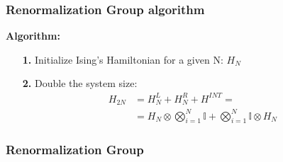 \documentclass[pt12]{beamer}
\begin{document}
\begin{frame}[fragile,label=RB]
	\frametitle{Renormalization Group algorithm}
	\tableofcontents[pausesections]
	\textbf{Algorithm:}
	\begin{itemize}
		\item[\textbf{1.}] Initialize Ising's Hamiltonian for a given N:  $H_N$
		\item[\textbf{2.}] Double the system size:
		$$
		\begin{align}
			H_{2N} &= H^{L}_N + H^R_N + H^{INT} =\\
			       &= H_N\otimes \bigotimes_{i=1}^{N}\mathbb{I} + \bigotimes_{i=1}^{N}\mathbb{I} \otimes H_N
		\end{align}$$ 
	\end{itemize}
\end{frame}

\begin{frame}[fragile,label=RB]
	\frametitle{Renormalization Group}
	\tableofcontents[pausesections]
\end{frame}


\end{document}
